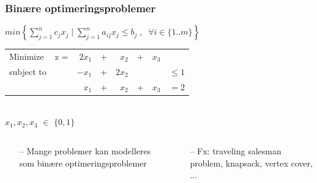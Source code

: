 \documentclass[smaller]{beamer}
\begin{document}
\begin{frame}
\frametitle{Binære optimeringsproblemer}
\begin{center}
        $min \left\{\sum\limits_{j=1}^n c_jx_j \; | \; \sum\limits_{j=1}^n a_{ij}x_j \leq b_j \; , \; \; \forall i \in 
\{1..m\}\right\}$
\pause
\begin{tabular}{llrcrlrl}
Minimize   & z =&$2x_1$        & +  & $x_2$       & + & $x_3$ &          \\
subject to &     &$-x_1$        & + & $2x_2$      &   &       & $\leq 1$  \\
           &     &$x_1$         & + & $x_2$       & + & $x_3$ & $=2$     \\
               
\end{tabular} \\ 
 $x_1,x_2,x_3 $  $\in$ $\{0,1\}$ 
 \pause
\end{center}
\begin{columns}[T]
    \begin{column}[T]{.5\textwidth}
    \begin{itemize}[<+->]
     \item [--]Mange problemer kan modelleres som binære optimeringsproblemer 
    \end{itemize}
    \end{column}
    
       \begin{column}[T]{.5\textwidth}
           \begin{itemize}[<+->]
     \item [--]Fx: traveling salesman problem, knapsack, vertex cover, ... \newline\newline
    \end{itemize}
       \end{column}
       
\end{columns} 

  
\end{frame}
\end{document}
